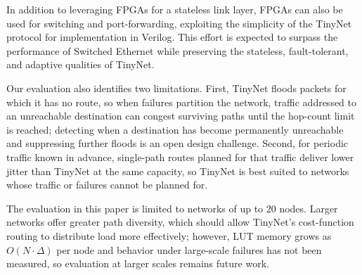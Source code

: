 In addition to leveraging FPGAs for a stateless link layer, FPGAs can also be used for switching and port-forwarding, exploiting the simplicity of the TinyNet protocol for implementation in Verilog. This effort is expected to surpass the performance of Switched Ethernet while preserving the stateless, fault-tolerant, and adaptive qualities of TinyNet.

Our evaluation also identifies two limitations. First, TinyNet floods packets for which it has no route, so when failures partition the network, traffic addressed to an unreachable destination can congest surviving paths until the hop-count limit is reached; detecting when a destination has become permanently unreachable and suppressing further floods is an open design challenge. Second, for periodic traffic known in advance, single-path routes planned for that traffic deliver lower jitter than TinyNet at the same capacity, so TinyNet is best suited to networks whose traffic or failures cannot be planned for.

The evaluation in this paper is limited to networks of up to 20 nodes. Larger networks offer greater path diversity, which should allow TinyNet's cost-function routing to distribute load more effectively; however, LUT memory grows as $O(N \cdot \Delta)$ per node and behavior under large-scale failures has not been measured, so evaluation at larger scales remains future work.

